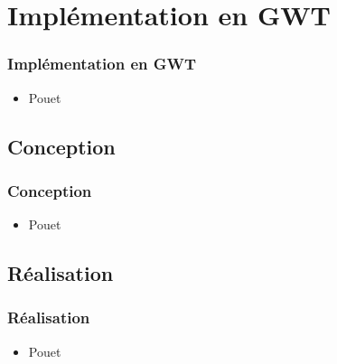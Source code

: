 \section{Implémentation en GWT}
  \begin{frame}
    \frametitle{Implémentation en GWT}
    \begin{itemize}
      \item Pouet
    \end{itemize}
  \end{frame}

  \subsection*{Conception}
    \begin{frame}
      \frametitle{Conception}
      \begin{itemize}
        \item Pouet
      \end{itemize}
    \end{frame}

  \subsection*{Réalisation}
    \begin{frame}
      \frametitle{Réalisation}
      \begin{itemize}
        \item Pouet
      \end{itemize}
    \end{frame}

